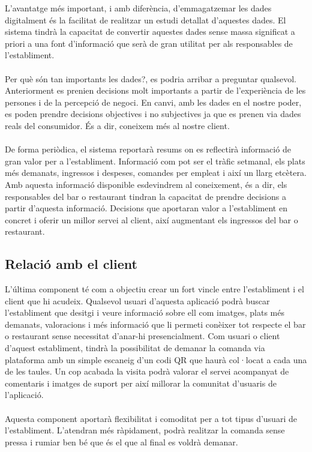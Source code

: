 L'avantatge més important, i amb diferència, d'emmagatzemar les dades digitalment és la facilitat de realitzar un estudi detallat d'aquestes dades. El sistema tindrà la capacitat de convertir aquestes dades sense massa significat a priori a una font d'informació que serà de gran utilitat per als responsables de l'establiment.
\\\\
Per què són tan importants les dades?, es podria arribar a preguntar qualsevol. Anteriorment es prenien decisions molt importants a partir de l'experiència de les persones i de la percepció de negoci. En canvi, amb les dades en el nostre poder, es poden prendre decisions objectives i no subjectives ja que es prenen via dades reals del consumidor. És a dir, coneixem més al nostre client.
\\\\
De forma periòdica, el sistema reportarà resums on es reflectirà informació de gran valor per a l'establiment. Informació com pot ser el tràfic setmanal, els plats més demanats, ingressos i despeses, comandes per empleat i així un llarg etcètera. Amb aquesta informació disponible esdevindrem al coneixement, és a dir, els responsables del bar o restaurant tindran la capacitat de prendre decisions a partir d'aquesta informació. Decisions que aportaran valor a l'establiment en concret i oferir un millor servei al client, així augmentant els ingressos del bar o restaurant.

\subsection{Relació amb el client}

L'última component té com a objectiu crear un fort vincle entre l'establiment i el client que hi acudeix. Qualsevol usuari d'aquesta aplicació podrà buscar l'establiment que desitgi i veure informació sobre ell com imatges, plats més demanats, valoracions i més informació que li permeti conèixer tot respecte el bar o restaurant sense necessitat d'anar-hi presencialment. Com usuari o client d'aquest establiment, tindrà la possibilitat de demanar la comanda via plataforma amb un simple escaneig d'un codi QR que haurà col·locat a cada una de les taules. Un cop acabada la visita podrà valorar el servei acompanyat de comentaris i imatges de suport per així millorar la comunitat d'usuaris de l'aplicació.
\\\\
Aquesta component aportarà flexibilitat i comoditat per a tot tipus d'usuari de l'establiment. L'atendran més ràpidament, podrà realitzar la comanda sense pressa i rumiar ben bé que és el que al final es voldrà demanar.

